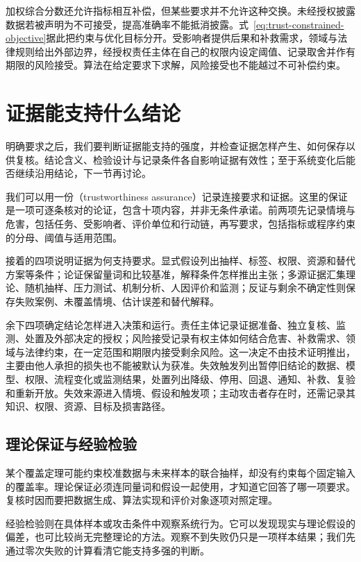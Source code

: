 加权综合分数还允许指标相互补偿，但某些要求并不允许这种交换。未经授权披露数据若被声明为不可接受，提高准确率不能抵消披露。式~\eqref{eq:trust-constrained-objective}据此把约束与优化目标分开。受影响者提供后果和补救需求，领域与法律规则给出外部边界，经授权责任主体在自己的权限内设定阈值、记录取舍并作有期限的风险接受。算法在给定要求下求解，风险接受也不能越过不可补偿约束。

\section{证据能支持什么结论}
\label{sec:trust-evidence}

明确要求之后，我们要判断证据能支持的强度，并检查证据怎样产生、如何保存以供复核。结论含义、检验设计与记录条件各自影响证据有效性；至于系统变化后能否继续沿用结论，下一节再讨论。

我们可以用一份（trustworthiness assurance）记录连接要求和证据。这里的保证是一项可逐条核对的论证，包含十项内容，并非无条件承诺。前两项先记录情境与危害，包括任务、受影响者、评价单位和行动链，再写要求，包括指标或程序约束的分母、阈值与适用范围。

接着的四项说明证据为何支持要求。显式假设列出抽样、标签、权限、资源和替代方案等条件；论证保留量词和比较基准，解释条件怎样推出主张；多源证据汇集理论、随机抽样、压力测试、机制分析、人因评价和监测；反证与剩余不确定性则保存失败案例、未覆盖情境、估计误差和替代解释。

余下四项确定结论怎样进入决策和运行。责任主体记录证据准备、独立复核、监测、处置及外部决定的授权；风险接受记录有权主体如何结合危害、补救需求、领域与法律约束，在一定范围和期限内接受剩余风险。这一决定不由技术证明推出，主要由他人承担的损失也不能被默认为获准。失效触发列出暂停旧结论的数据、模型、权限、流程变化或监测结果，处置列出降级、停用、回退、通知、补救、复验和重新开放。失效来源进入情境、假设和触发项；主动攻击者存在时，还需记录其知识、权限、资源、目标及损害路径。

\subsection{理论保证与经验检验}

某个覆盖定理可能约束校准数据与未来样本的联合抽样，却没有约束每个固定输入的覆盖率。理论保证必须连同量词和假设一起使用，才知道它回答了哪一项要求。复核时因而要把数据生成、算法实现和评价对象逐项对照定理。

经验检验则在具体样本或攻击条件中观察系统行为。它可以发现现实与理论假设的偏差，也可比较尚无完整理论的方法。观察不到失败仍只是一项样本结果；我们先通过零次失败的计算看清它能支持多强的判断。

